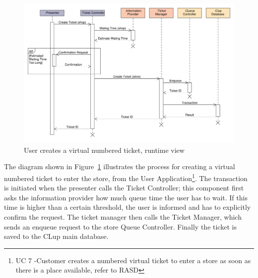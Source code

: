 \begin{figure}[H]
    \hspace{-2cm}
    \includegraphics[width=1.2\textwidth]{Images/UML_virtual_ticket_sequence.pdf}
    \caption{\label{fig:UML_virtual_ticket_sequence}User creates a virtual numbered ticket, runtime view}
\end{figure}
The diagram shown in Figure~\ref{fig:UML_virtual_ticket_sequence} illustrates the process for creating a virtual numbered ticket to enter the store, from the User Application\footnote{UC 7 -Customer creates a numbered virtual ticket to enter a store as soon as there is a place available, refer to RASD}. The transaction is initiated when the presenter calls the Ticket Controller; this component first asks the information provider how much queue time the user has to wait. If this time is higher than a certain threshold, the user is informed and has to explicitly confirm the request. The ticket manager then calls the Ticket Manager, which sends an enqueue request to the store Queue Controller. Finally the ticket is saved to the CLup main database.

\clearpage

